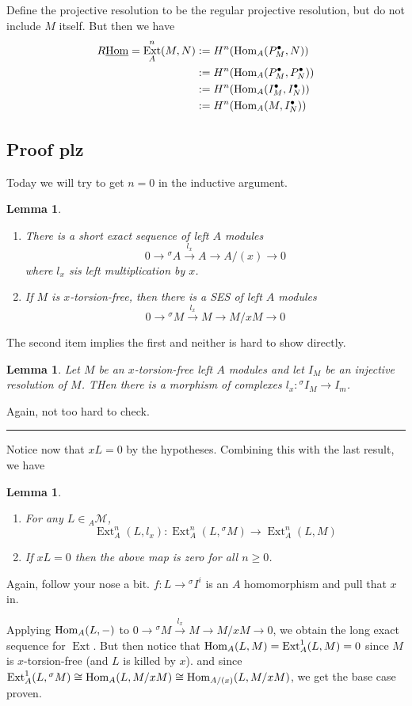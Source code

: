 \documentclass[12pt]{article}
\theoremstyle{break}
\theoremstyle{nonumberbreak}
\theoremstyle{changebreak}
\newtheorem{lem}[thm]{Lemma}
\theoremstyle{break}
\theoremstyle{nonumberbreak}
\theoremstyle{nonumberplain}
\theoremstyle{change}
\newcommand*{\brk}{
\rule{2in}{.1pt}
}
\DeclareMathOperator{\Ext}{Ext}
\newcommand*{\Hom}{\ensuremath\text{Hom}}
\newcommand*{\calM}{\mathcal{M}}
\begin{document}
Define the projective resolution to be the regular projective resolution, but do not include $M$ itself. But then we have
\begin{align*}
	R\underline{\Hom}=\Ext_A^n(M,N)&:=H^n(\Hom_A(P^\bullet_M,N))\\
	&:=H^n(\Hom_A(P_M^\bullet,P_N^\bullet))\\
	&:=H^n(\Hom_A(I_M^\bullet, I_N^\bullet))\\
	&:=H^n(\Hom_A(M,I_N^\bullet))
\end{align*}

\subsection{Proof plz}
Today we will try to get $n=0$ in the inductive argument.
\begin{lem}
	\begin{enumerate}
		\item  There is a short exact sequence of left $A$ modules
		\[0\to {^\sigma A}\xrightarrow{l_x}A\to A/(x)\to 0\]
		where $l_x$ sis left multiplication by $x$.
		\item If $M$ is $x$-torsion-free, then there is a SES of left $A$ modules
		\[0\to {^\sigma M}\xrightarrow{l_x}M\to M/xM\to 0\]
	\end{enumerate}
\end{lem}
The second item implies the first and neither is hard to show directly.
\begin{lem}
	Let $M$ be an $x$-torsion-free left $A$ modules and let $I_M$ be an injective resolution of $M$. THen there is a morphism of complexes
	$l_x:{^\sigma I_M}\to I_m$.
\end{lem}
Again, not too hard to check.

\brk

Notice now that $xL=0$ by the hypotheses. Combining this with the last result, we have
\begin{lem}
	\begin{enumerate}
		\item For any $L\in {_A\calM}$,
		\[\Ext_A^n(L,l_x):\Ext_A^n(L,{^\sigma M})\to \Ext_A^n(L,M)\]
		\item If $xL=0$ then the above map is zero for all $n\ge 0$.
	\end{enumerate}
\end{lem}
Again, follow your nose a bit. $f:L\to {^\sigma I^i}$ is an $A$ homomorphism and pull that $x$ in.

Applying $\Hom_A(L,-)$ to $0\to {^\sigma M}\xrightarrow{l_x}M\to M/xM\to 0$, we obtain the long exact sequence
for $\Ext$. But then notice that $\Hom_A(L,M)=\Ext_A^1(L,M)=0$ since $M$ is $x$-torsion-free (and $L$ is killed by $x$).
and since $\Ext_A^1(L,{^\sigma M})\cong \Hom_A(L,M/xM)\cong\Hom_{A/(x)}(L,M/xM)$, we get the base case proven.
\end{document}
